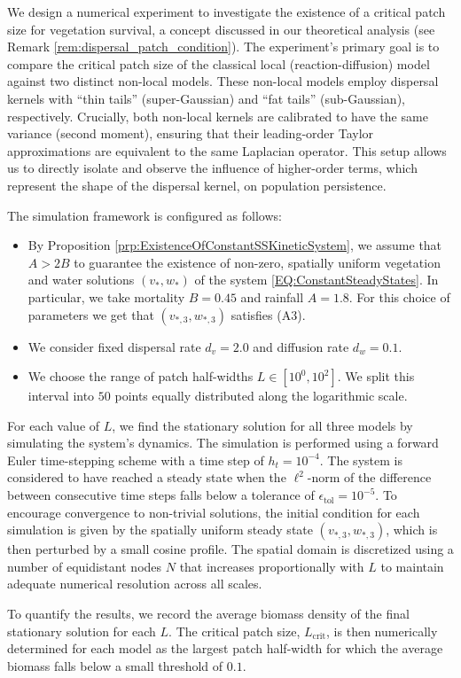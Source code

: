 \documentclass[review,onefignum,onetabnum]{SIAM-styles/siamart171218}
\begin{document}
\begin{expe}
    We design a numerical experiment to investigate the existence of a critical patch size for vegetation survival, a concept discussed in our theoretical analysis (see Remark \ref{rem:dispersal_patch_condition}). The experiment's primary goal is to compare the critical patch size of the classical local (reaction-diffusion) model against two distinct non-local models. These non-local models employ dispersal kernels with ``thin tails'' (super-Gaussian) and ``fat tails'' (sub-Gaussian), respectively. Crucially, both non-local kernels are calibrated to have the same variance (second moment), ensuring that their leading-order Taylor approximations are equivalent to the same Laplacian operator. This setup allows us to directly isolate and observe the influence of higher-order terms, which represent the shape of the dispersal kernel, on population persistence.
    
    The simulation framework is configured as follows:
    \begin{itemize}
        \item By Proposition \ref{prp:ExistenceOfConstantSSKineticSystem}, we assume that $A > 2B$ to guarantee the existence of non-zero, spatially uniform vegetation and water solutions $(v_*, w_*)$ of the system \eqref{EQ:ConstantSteadyStates}. In particular, we take mortality $B = 0.45$ and rainfall $A = 1.8$. For this choice of parameters we get that $(v_{*, 3}, w_{*, 3})$ satisfies (A3).
        \item We consider fixed dispersal rate $d_v = 2.0$ and diffusion rate $d_w = 0.1$.
        \item We choose the range of patch half-widths $L \in [10^{0}, 10^2]$. We split this interval into $50$ points equally distributed along the logarithmic scale.
    \end{itemize}
    For each value of $L$, we find the stationary solution for all three models by simulating the system's dynamics. The simulation is performed using a forward Euler time-stepping scheme with a time step of $h_t = 10^{-4}$. The system is considered to have reached a steady state when the $\ell^2$-norm of the difference between consecutive time steps falls below a tolerance of $\epsilon_{\text{tol}} = 10^{-5}$. To encourage convergence to non-trivial solutions, the initial condition for each simulation is given by the spatially uniform steady state $(v_{*,3}, w_{*,3})$, which is then perturbed by a small cosine profile. The spatial domain is discretized using a number of equidistant nodes $N$ that increases proportionally with $L$ to maintain adequate numerical resolution across all scales.

    To quantify the results, we record the average biomass density of the final stationary solution for each $L$. The critical patch size, $L_{\text{crit}}$, is then numerically determined for each model as the largest patch half-width for which the average biomass falls below a small threshold of $0.1$.
\end{expe}
\end{document}

